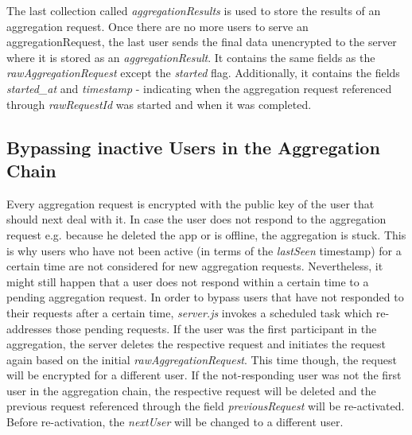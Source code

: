\begin{samepage}
The last collection called \textit{aggregationResults} is used to store the results of an aggregation request. Once there are no more users to serve an aggregationRequest, the last user sends the final data unencrypted to the server where it is stored as an \textit{aggregationResult}. It contains the same fields as the \textit{rawAggregationRequest} except the \textit{started} flag. Additionally, it contains the fields \textit{started\_at} and \textit{timestamp} - indicating when the aggregation request referenced through \textit{rawRequestId} was started and when it was completed.
\end{samepage}

\subsection{Bypassing inactive Users in the Aggregation Chain}\label{request-chain}
Every aggregation request is encrypted with the public key of the user that should next deal with it. In case the user does not respond to the aggregation request e.g. because he deleted the app or is offline, the aggregation is stuck. This is why users who have not been active (in terms of the \textit{lastSeen} timestamp) for a certain time are not considered for new aggregation requests. Nevertheless, it might still happen that a user does not respond within a certain time to a pending aggregation request. In order to bypass users that have not responded to their requests after a certain time, \textit{server.js} invokes a scheduled task which re-addresses those pending requests. If the user was the first participant in the aggregation, the server deletes the respective request and initiates the request again based on the initial \textit{rawAggregationRequest}. This time though, the request will be encrypted for a different user. If the not-responding user was not the first user in the aggregation chain, the respective request will be deleted and the previous request referenced through the field \textit{previousRequest} will be re-activated. Before re-activation, the \textit{nextUser} will be changed to a different user.